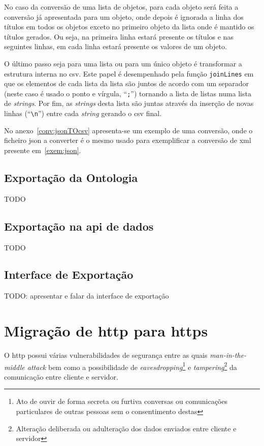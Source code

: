 No caso da conversão de uma lista de objetos, para cada objeto será feita a conversão já apresentada para um objeto, onde depois é ignorada a linha dos títulos em todos os objetos exceto no primeiro objeto da lista onde é mantido os títulos gerados. Ou seja, na primeira linha estará presente os títulos e nas seguintes linhas, em cada linha estará presente os valores de um objeto.

O último passo seja para uma lista ou para um único objeto é transformar a estrutura interna no \acrshort{csv}. Este papel é desempenhado pela função \texttt{joinLines} em que os elementos de cada lista da lista são juntos de acordo com um separador (neste caso é usado o ponto e vírgula, ``\texttt{;}'') tornando a lista de listas numa lista de \textit{strings}. Por fim, as \textit{strings} desta lista são juntas através da inserção de novas linhas (``\texttt{\textbackslash{}n}'') entre cada \textit{string} gerando o \acrshort{csv} final.

No anexo~\ref{conv:jsonTOcsv} apresenta-se um exemplo de uma conversão, onde o ficheiro \acrshort{json} a converter é o mesmo usado para exemplificar a conversão de \acrshort{xml} presente em~\ref{exem:json}.

\subsection{Exportação da Ontologia}

TODO

\subsection{Exportação na \acrshort{api} de dados}

TODO

\subsection{Interface de Exportação}

TODO: apresentar e falar da interface de exportação

\section{Migração de \acrshort{http} para \acrshort{https}}

O \acrfull{http} possui várias vulnerabilidades de segurança entre as quais \textit{man-in-the-middle attack} bem como a possibilidade de \textit{eavesdropping}\footnote{Ato de ouvir de forma secreta ou furtiva conversas ou comunicações particulares de outras pessoas sem o consentimento destas} e \textit{tampering}\footnote{Alteração deliberada ou adulteração dos dados enviados entre cliente e servidor} da comunicação entre cliente e servidor.

